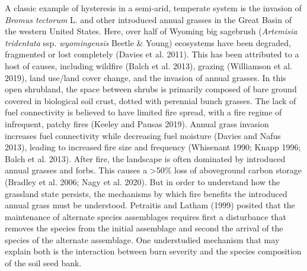 \documentclass[
  12pt,
]{article}
\begin{document}
A classic example of hysteresis in a semi-arid, temperate system is the
invasion of \emph{Bromus tectorum} L. and other introduced annual
grasses in the Great Basin of the western United States. Here, over half
of Wyoming big sagebrush (\emph{Artemisia tridentata} ssp.
\emph{wyomingensis} Beetle \& Young) ecosystems have been degraded,
fragmented or lost completely (Davies et al. 2011). This has been
attributed to a host of causes, including wildfire (Balch et al. 2013),
grazing (Williamson et al. 2019), land use/land cover change, and the
invasion of annual grasses. In this open shrubland, the space between
shrubs is primarily composed of bare ground covered in biological soil
crust, dotted with perennial bunch grasses. The lack of fuel
connectivity is believed to have limited fire spread, with a fire regime
of infrequent, patchy fires (Keeley and Pausas 2019). Annual grass
invasion increases fuel connectivity while decreasing fuel moisture
(Davies and Nafus 2013), leading to increased fire size and frequency
(Whisenant 1990; Knapp 1996; Balch et al. 2013). After fire, the
landscape is often dominated by introduced annual grasses and forbs.
This causes a \textgreater50\% loss of aboveground carbon storage
(Bradley et al. 2006; Nagy et al. 2020). But in order to understand how
the grassland state persists, the mechanisms by which fire benefits the
introduced annual grass must be understood. Petraitis and Latham (1999)
posited that the maintenance of alternate species assemblages requires
first a disturbance that removes the species from the initial assemblage
and second the arrival of the species of the alternate assemblage. One
understudied mechanism that may explain both is the interaction between
burn severity and the species composition of the soil seed bank.
\end{document}
